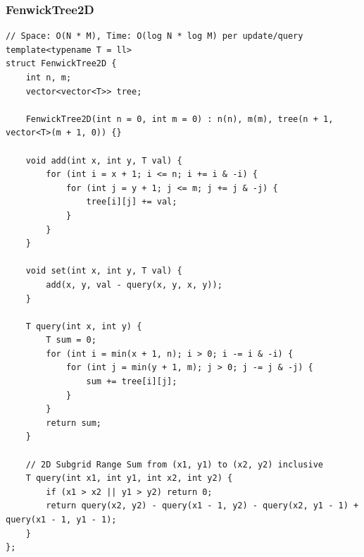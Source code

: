 \documentclass[9pt,a4paper,twocolumn]{extarticle}
\begin{document}
\subsubsection{FenwickTree2D}
\nopagebreak
\begin{lstlisting}
// Space: O(N * M), Time: O(log N * log M) per update/query
template<typename T = ll>
struct FenwickTree2D {
    int n, m;
    vector<vector<T>> tree;

    FenwickTree2D(int n = 0, int m = 0) : n(n), m(m), tree(n + 1, vector<T>(m + 1, 0)) {}

    void add(int x, int y, T val) {
        for (int i = x + 1; i <= n; i += i & -i) {
            for (int j = y + 1; j <= m; j += j & -j) {
                tree[i][j] += val;
            }
        }
    }

    void set(int x, int y, T val) {
        add(x, y, val - query(x, y, x, y));
    }

    T query(int x, int y) {
        T sum = 0;
        for (int i = min(x + 1, n); i > 0; i -= i & -i) {
            for (int j = min(y + 1, m); j > 0; j -= j & -j) {
                sum += tree[i][j];
            }
        }
        return sum;
    }

    // 2D Subgrid Range Sum from (x1, y1) to (x2, y2) inclusive
    T query(int x1, int y1, int x2, int y2) {
        if (x1 > x2 || y1 > y2) return 0;
        return query(x2, y2) - query(x1 - 1, y2) - query(x2, y1 - 1) + query(x1 - 1, y1 - 1);
    }
};
\end{lstlisting}

\filbreak
\end{document}
